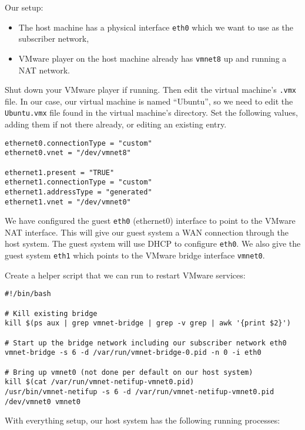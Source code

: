 Our setup:

\begin{itemize}
\item The host machine has a physical interface \texttt{eth0} which we
  want to use as the subscriber network,
\item VMware player on the host machine already has \texttt{vmnet8} up
  and running a NAT network.
\end{itemize}

Shut down your VMware player if running. Then edit the virtual
machine's \texttt{.vmx} file. In our case, our virtual machine is
named ``Ubuntu'', so we need to edit the \texttt{Ubuntu.vmx} file
found in the virtual machine's directory. Set the following values,
adding them if not there already, or editing an existing entry. 

{\footnotesize%
\begin{verbatim}
ethernet0.connectionType = "custom"
ethernet0.vnet = "/dev/vmnet8"

ethernet1.present = "TRUE"
ethernet1.connectionType = "custom"
ethernet1.addressType = "generated"
ethernet1.vnet = "/dev/vmnet0"
\end{verbatim}%
}

We have configured the guest \texttt{eth0} (ethernet0) interface to
point to the VMware NAT interface. This will give our guest system a
WAN connection through the host system. The guest system will use DHCP
to configure \texttt{eth0}. We also give the guest system
\texttt{eth1} which points to the VMware bridge interface
\texttt{vmnet0}.

Create a helper script that we can run to restart VMware services:

{\footnotesize%
\begin{verbatim}
#!/bin/bash

# Kill existing bridge 
kill $(ps aux | grep vmnet-bridge | grep -v grep | awk '{print $2}')

# Start up the bridge network including our subscriber network eth0
vmnet-bridge -s 6 -d /var/run/vmnet-bridge-0.pid -n 0 -i eth0

# Bring up vmnet0 (not done per default on our host system)
kill $(cat /var/run/vmnet-netifup-vmnet0.pid)
/usr/bin/vmnet-netifup -s 6 -d /var/run/vmnet-netifup-vmnet0.pid /dev/vmnet0 vmnet0
\end{verbatim}%
}

With everything setup, our host system has the following running processes:

